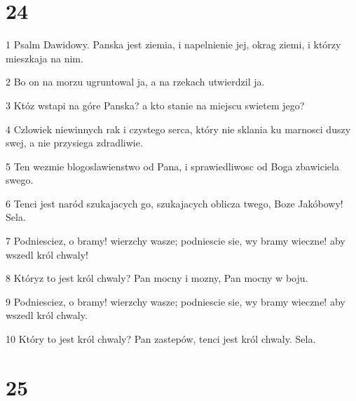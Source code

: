 \chapter{24}

\par 1 Psalm Dawidowy. Panska jest ziemia, i napelnienie jej, okrag ziemi, i którzy mieszkaja na nim.
\par 2 Bo on na morzu ugruntowal ja, a na rzekach utwierdzil ja.
\par 3 Któz wstapi na góre Panska? a kto stanie na miejscu swietem jego?
\par 4 Czlowiek niewinnych rak i czystego serca, który nie sklania ku marnosci duszy swej, a nie przysiega zdradliwie.
\par 5 Ten wezmie blogoslawienstwo od Pana, i sprawiedliwosc od Boga zbawiciela swego.
\par 6 Tenci jest naród szukajacych go, szukajacych oblicza twego, Boze Jakóbowy! Sela.
\par 7 Podniesciez, o bramy! wierzchy wasze; podniescie sie, wy bramy wieczne! aby wszedl król chwaly!
\par 8 Któryz to jest król chwaly? Pan mocny i mozny, Pan mocny w boju.
\par 9 Podniesciez, o bramy! wierzchy wasze; podniescie sie, wy bramy wieczne! aby wszedl król chwaly.
\par 10 Który to jest król chwaly? Pan zastepów, tenci jest król chwaly. Sela.

\chapter{25}

